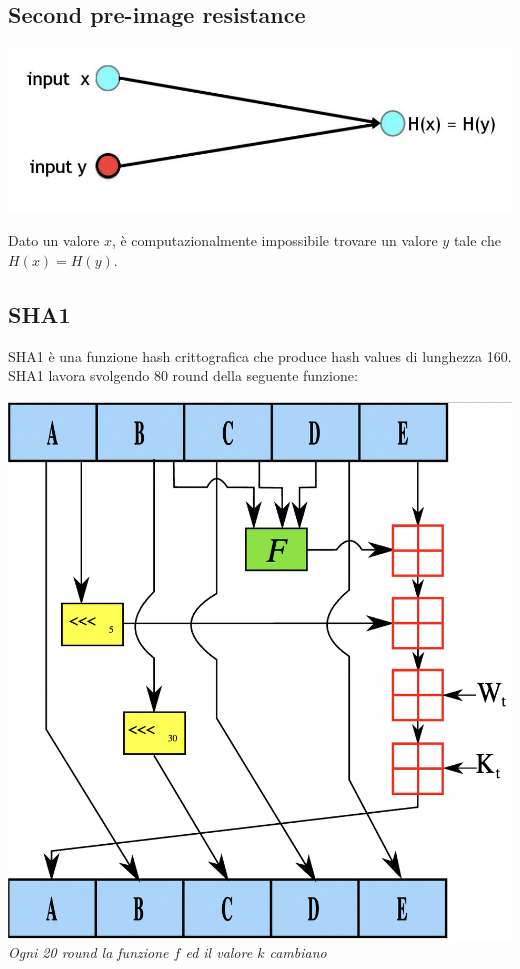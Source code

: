 \documentclass[11pt, oneside]{article}   	%
\begin{document}
\subsection*{Second pre-image resistance}
\begin{center}
\includegraphics[scale= 0.3]{h3}
\end{center}
Dato un valore $x$, è computazionalmente impossibile trovare un valore $y$ tale che $H(x) = H(y)$.

\subsection*{SHA1}
SHA1 è una funzione hash crittografica che produce hash values di lunghezza 160. SHA1 lavora svolgendo 80 round della seguente funzione:
\begin{center}
\includegraphics[scale= 0.3]{sh1}\\
\emph{Ogni 20 round la funzione $f$ ed il valore $k$ cambiano}
\end{center}
\end{document}
